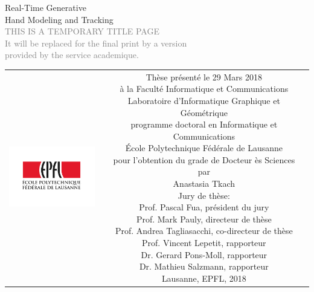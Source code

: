 
\begin{titlepage}
\begin{center}


\null\vspace{1.5cm}
{\Huge \sc Real-Time Generative \\[13pt] Hand Modeling and Tracking } \\[65pt] 
\textcolor{gray}{\small{THIS IS A TEMPORARY TITLE PAGE \\ [3pt] 
It will be replaced for the final print by a version \\ provided by the service academique.}}
    
\vfill

\begin{tabular} {cc}
\parbox{0.3\textwidth}{\includegraphics[width=4cm]{images/epfl}}
&
\parbox{0.7\textwidth}{%
	Thèse présenté le 29 Mars 2018\\
	à la Faculté Informatique et Communications \\
	Laboratoire d’Informatique Graphique et Géométrique \\
	programme doctoral en Informatique et Communications \\
	École Polytechnique Fédérale de Lausanne\\[12pt]
	pour l'obtention du grade de Docteur ès Sciences\\
	par\\ [6pt]
	\null \hspace{3em} Anastasia Tkach\\[12pt]
%
\small
Jury de thèse:\\[12pt]
%
    Prof. Pascal Fua, président du jury\\
    Prof. Mark Pauly, directeur de thèse\\
    Prof. Andrea Tagliasacchi, co-directeur de thèse\\
    Prof. Vincent Lepetit, rapporteur\\
    Dr. Gerard Pons-Moll, rapporteur\\
    Dr. Mathieu Salzmann, rapporteur\\[12pt]
%
Lausanne, EPFL, 2018}
\end{tabular}
\end{center}
\vspace{2cm}
\end{titlepage}




